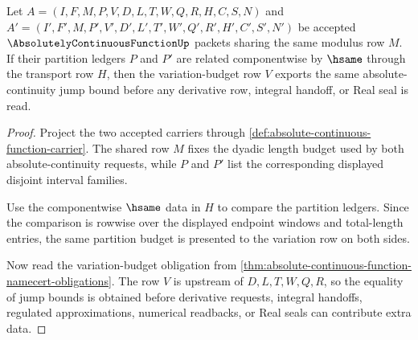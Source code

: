 \begin{theorem}
\label{thm:absolute-continuous-function-partition-modulus-stability}
Let $A=(I,F,M,P,V,D,L,T,W,Q,R,H,C,S,N)$ and $A'=(I',F',M,P',V',D',L',T',W',Q',R',H',C',S',N')$ be accepted $\AbsolutelyContinuousFunctionUp$ packets sharing the same modulus row $M$. If their partition ledgers $P$ and $P'$ are related componentwise by $\hsame$ through the transport row $H$, then the variation-budget row $V$ exports the same absolute-continuity jump bound before any derivative row, integral handoff, or Real seal is read.
\end{theorem}
\begin{proof}
Project the two accepted carriers through \autoref{def:absolute-continuous-function-carrier}. The shared row $M$ fixes the dyadic length budget used by both absolute-continuity requests, while $P$ and $P'$ list the corresponding displayed disjoint interval families.

Use the componentwise $\hsame$ data in $H$ to compare the partition ledgers. Since the comparison is rowwise over the displayed endpoint windows and total-length entries, the same partition budget is presented to the variation row on both sides.

Now read the variation-budget obligation from \autoref{thm:absolute-continuous-function-namecert-obligations}. The row $V$ is upstream of $D,L,T,W,Q,R$, so the equality of jump bounds is obtained before derivative requests, integral handoffs, regulated approximations, numerical readbacks, or Real seals can contribute extra data.
\end{proof}

